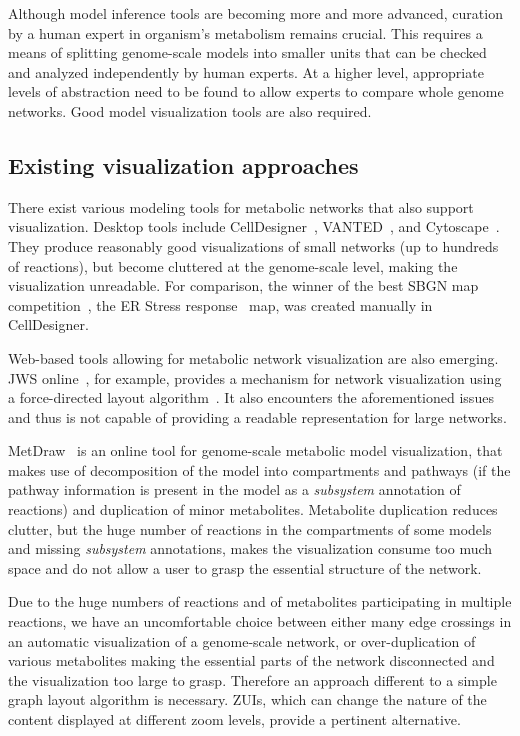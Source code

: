 \documentclass{bmcart}
\begin{document}
Although model inference tools are becoming more and more advanced, curation by a human expert in organism's metabolism remains crucial. This requires a means of splitting genome-scale models into smaller units that can be checked and analyzed independently by human experts. At a higher level, appropriate levels of abstraction need to be found to allow experts to compare whole genome networks. Good model visualization tools are also required.

\subsection*{Existing visualization approaches}
There exist various modeling tools for metabolic networks that also support visualization. Desktop tools include CellDesigner~\cite{Funahashi2008}, VANTED~\cite{Rohn2012}, and Cytoscape~\cite{Smoot2011}. They produce reasonably good visualizations of small networks (up to hundreds of reactions), but become cluttered at the genome-scale level, making the visualization unreadable. For comparison, the winner of the best SBGN map competition~\cite{SBGN}, the ER Stress response~\cite{Groenendyk2010} map,  was created manually in CellDesigner.

Web-based tools allowing for metabolic network visualization are also emerging.  JWS online~\cite{Snoep2003}, for example, provides a mechanism for network visualization using a force-directed layout algorithm~\cite{Fruchterman1991, Tamassia:2007:HGD:1202383}. It also encounters the aforementioned issues and thus is not capable of providing a readable representation for large networks.  

MetDraw~\cite{Jensen2014} is an online tool for genome-scale metabolic model visualization, that makes use of decomposition of the model into compartments and pathways (if the pathway information is present in the model as a \emph{subsystem} annotation of reactions) and duplication of minor metabolites. Metabolite duplication reduces clutter, but the huge number of reactions in the compartments of some models and missing \emph{subsystem} annotations, makes the visualization consume too much space and do not allow a user to grasp the essential structure of the network.

Due to the huge numbers of reactions and of metabolites participating in multiple reactions, we have an uncomfortable choice between either many edge crossings in an automatic visualization of a genome-scale network, or over-duplication of various metabolites making the essential parts of the network disconnected and the visualization too large to grasp. Therefore an approach different to a simple graph layout algorithm is necessary. ZUIs, which can change the nature of the content displayed at different zoom levels, provide a pertinent alternative.
\end{document}

